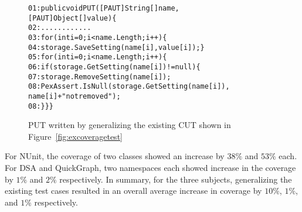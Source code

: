 \begin{figure}[t]
\begin{CodeOut}
\begin{alltt}
01: public void PUT([PAUT]String[] name, 
\hspace*{1.7in}[PAUT]Object[] value) \{
02: \hspace*{0.07in}............
03: \hspace*{0.07in}for (int i = 0; i < name.Length; i++) \{
04: \hspace*{0.22in}storage.SaveSetting(name[i], value[i]); \}
05: \hspace*{0.07in}for (int i = 0; i < name.Length; i++) \{
06: \hspace*{0.17in}if (storage.GetSetting(name[i]) != null) \{
07: \hspace*{0.3in}storage.RemoveSetting(name[i]);
08: \hspace*{0.3in}PexAssert.IsNull(storage.GetSetting(name[i]), 
\hspace*{1.5in}name[i] + " not removed"); 
08: \hspace*{0.1in}\}\}\}
\end{alltt}
\end{CodeOut}
\caption{PUT written by generalizing the existing CUT shown in Figure~\ref{fig:excoveragetest}}%
\label{fig:excoveragePUT}%
\end{figure}

For NUnit, the coverage of two classes showed an increase by $38\%$ and $53\%$ each. For DSA and QuickGraph, two namespaces each showed increase in the coverage by $1\%$ and $2\%$ respectively. In summary, for the three subjects, generalizing the existing test cases resulted in an overall average increase in coverage by $10\%$, $1\%$, and $1\%$ respectively.  

